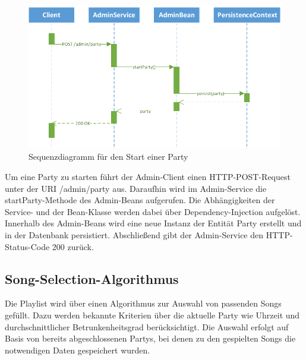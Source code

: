 \begin{figure}[tbh]
\centering
\includegraphics[width=1.0\linewidth]{Bilder/AufrufSequenz}
\caption{Sequenzdiagramm für den Start einer Party}
\label{fig:AufrufSequenz}
\end{figure}

Um eine Party zu starten führt der Admin-Client einen HTTP-POST-Request unter der URI /admin/party aus. Daraufhin wird im Admin-Service die startParty-Methode des Admin-Beans aufgerufen. Die Abhängigkeiten der Service- und der Bean-Klasse werden dabei über Dependency-Injection aufgelöst. Innerhalb des Admin-Beans wird eine neue Instanz der Entität Party erstellt und in der Datenbank persistiert. Abschließend gibt der Admin-Service den HTTP-Status-Code 200 zurück.

\subsection{Song-Selection-Algorithmus}
\label{sec:SongSelect}
Die Playlist wird über einen Algorithmus zur Auswahl von passenden Songs gefüllt. Dazu werden bekannte Kriterien über die aktuelle Party wie Uhrzeit und durchschnittlicher Betrunkenheitsgrad berücksichtigt. Die Auswahl erfolgt auf Basis von bereits abgeschlossenen Partys, bei denen zu den gespielten Songs die notwendigen Daten gespeichert wurden.


